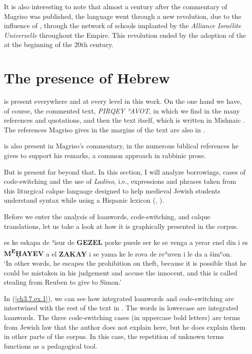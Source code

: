 \documentclass[output=paper,colorlinks,citecolor=brown,babel,arabicfont]{langscibook}
\begin{document}
It is also interesting to note that almost a century after the commentary of Magriso was published, the  language went through a new revolution, due to the influence of , through the network of schools implanted by the \textit{Alliance Israélite Universelle} throughout the  Empire. This revolution ended by the adoption of the   at the beginning of the 20th century. 

\section{The presence of Hebrew}\label{ch3.7.ss.3}

 is present everywhere and at every level in this work. On the one hand we have, of course, the commented text, \textit{PIRQEY ʾAVOT}, in which we find  in the many references and quotations, and then the text itself, which is written in Mishnaic . The references Magriso gives in the margins of the text are also in . 

 is also present in Magriso's commentary, in the numerous biblical references he gives to support his remarks, a common approach in rabbinic prose.

But  is present far beyond that. In this section, I will analyze borrowings, cases of code-switching and the use of \textit{Ladino}, i.e., expressions and phrases taken from this liturgical calque language designed to help medieval Jewish students understand  syntax while using a Hispanic lexicon (\citealt[71]{bossong1990}, \citealt[48--49]{sephiha1973}).

Before we enter the analysis of loanwords, code-switching, and calque translations, let us take a look at how it is graphically presented in the corpus. 

\ea \label{ch3.7.ex.1}
es ke eskapa de ʾisur de \textbf{GEZEL} porke puede ser ke se venga a yerar enel din i es \textbf{M\textsuperscript{E}ḤAYEV} a el \textbf{ZAKAY} i se yama ke le rova de reʾuven i le da a šimʿon. \\
`In other words, he escapes the prohibition on theft, because it is possible that he could be mistaken in his judgement and accuse the innocent, and this is called stealing from Reuben to give to Simon.'
\z


In (\ref{ch3.7.ex.1}), we can see how integrated  loanwords and code-switching are intertwined with the rest of the text in . The words in lowercase are integrated loanwords. The three code-switching cases (in uppercase bold letters) are terms from Jewish law that the author does not explain here, but he does explain them in other parts of the corpus. In this case, the repetition of unknown  terms functions as a pedagogical tool. 
\end{document}
